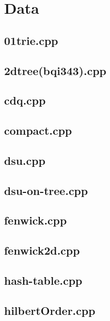 \section{Data}

\subsection{01trie.cpp}


\subsection{2dtree(bqi343).cpp}


\subsection{cdq.cpp}


\subsection{compact.cpp}


\subsection{dsu.cpp}


\subsection{dsu-on-tree.cpp}


\subsection{fenwick.cpp}


\subsection{fenwick2d.cpp}


\subsection{hash-table.cpp}


\subsection{hilbertOrder.cpp}


